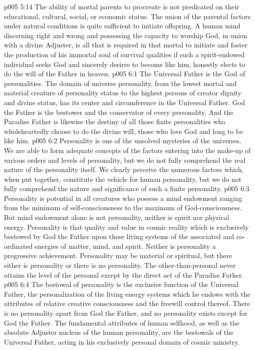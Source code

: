 \vs p005 5:14 The ability of mortal parents to procreate is not predicated on their educational, cultural, social, or economic status. The union of the parental factors under natural conditions is quite sufficient to initiate offspring. A human mind discerning right and wrong and possessing the capacity to worship God, in union with a divine Adjuster, is all that is required in that mortal to initiate and foster the production of his immortal soul of survival qualities if such a spirit\hyp{}endowed individual seeks God and sincerely desires to become like him, honestly elects to do the will of the Father in heaven.
\vs p005 6:1 The Universal Father is the God of personalities. The domain of universe personality, from the lowest mortal and material creature of personality status to the highest persons of creator dignity and divine status, has its center and circumference in the Universal Father. God the Father is the bestower and the conservator of every personality. And the Paradise Father is likewise the destiny of all those finite personalities who wholeheartedly choose to do the divine will, those who love God and long to be like him.
\vs p005 6:2 \pc Personality is one of the unsolved mysteries of the universes. We are able to form adequate concepts of the factors entering into the make\hyp{}up of various orders and levels of personality, but we do not fully comprehend the real nature of the personality itself. We clearly perceive the numerous factors which, when put together, constitute the vehicle for human personality, but we do not fully comprehend the nature and significance of such a finite personality.
\vs p005 6:3 Personality is potential in all creatures who possess a mind endowment ranging from the minimum of self\hyp{}consciousness to the maximum of God\hyp{}consciousness. But mind endowment alone is not personality, neither is spirit nor physical energy. Personality is that quality and value in cosmic reality which is exclusively bestowed by God the Father upon these living systems of the associated and co\hyp{}ordinated energies of matter, mind, and spirit. Neither is personality a progressive achievement. Personality may be material or spiritual, but there either is personality or there is no personality. The other\hyp{}than\hyp{}personal never attains the level of the personal except by the direct act of the Paradise Father.
\vs p005 6:4 The bestowal of personality is the exclusive function of the Universal Father, the personalization of the living energy systems which he endows with the attributes of relative creative consciousness and the freewill control thereof. There is no personality apart from God the Father, and no personality exists except for God the Father. The fundamental attributes of human selfhood, as well as the absolute Adjuster nucleus of the human personality, are the bestowals of the Universal Father, acting in his exclusively personal domain of cosmic ministry.
